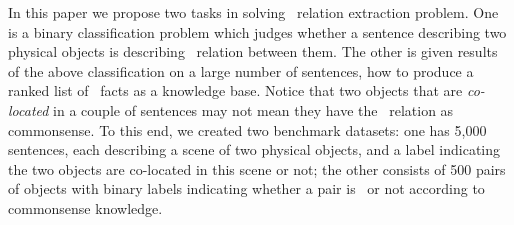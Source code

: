 %
%
%
%
%


In this paper we propose two tasks in solving \lnear\ relation
extraction problem. 
One is a binary classification problem which judges whether 
a sentence describing two physical objects is describing \lnear\ relation between them.
The other is given results of the above classification on a
large number of sentences, how to produce a ranked list of \lnear\
facts as a knowledge base.
Notice that two objects that are {\em co-located} in a couple of sentences
may not mean they have the \lnear\ relation as commonsense.
To this end, we created two 
benchmark datasets: one has 5,000 sentences, 
each describing a scene of two physical objects,
and a label indicating the two objects are co-located in this scene or not; 
the other consists of 500 pairs of
objects with binary labels indicating whether a pair is \lnear\ or not according to commonsense knowledge.  


